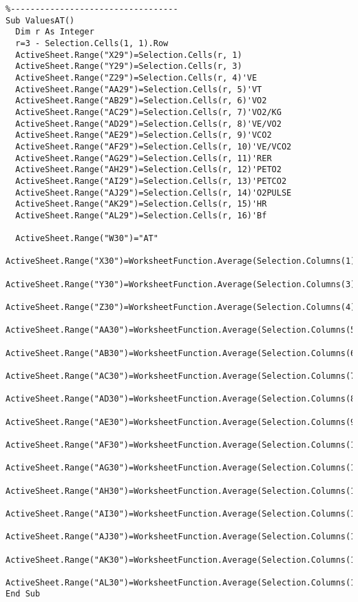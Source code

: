 \begin{lstlisting}
%----------------------------------
Sub ValuesAT()
  Dim r As Integer
  r=3 - Selection.Cells(1, 1).Row
  ActiveSheet.Range("X29")=Selection.Cells(r, 1)
  ActiveSheet.Range("Y29")=Selection.Cells(r, 3)
  ActiveSheet.Range("Z29")=Selection.Cells(r, 4)'VE
  ActiveSheet.Range("AA29")=Selection.Cells(r, 5)'VT
  ActiveSheet.Range("AB29")=Selection.Cells(r, 6)'VO2
  ActiveSheet.Range("AC29")=Selection.Cells(r, 7)'VO2/KG
  ActiveSheet.Range("AD29")=Selection.Cells(r, 8)'VE/VO2
  ActiveSheet.Range("AE29")=Selection.Cells(r, 9)'VCO2
  ActiveSheet.Range("AF29")=Selection.Cells(r, 10)'VE/VCO2
  ActiveSheet.Range("AG29")=Selection.Cells(r, 11)'RER
  ActiveSheet.Range("AH29")=Selection.Cells(r, 12)'PETO2
  ActiveSheet.Range("AI29")=Selection.Cells(r, 13)'PETCO2
  ActiveSheet.Range("AJ29")=Selection.Cells(r, 14)'O2PULSE
  ActiveSheet.Range("AK29")=Selection.Cells(r, 15)'HR
  ActiveSheet.Range("AL29")=Selection.Cells(r, 16)'Bf
  
  ActiveSheet.Range("W30")="AT"
  ActiveSheet.Range("X30")=WorksheetFunction.Average(Selection.Columns(1))'TIME
  ActiveSheet.Range("Y30")=WorksheetFunction.Average(Selection.Columns(3))'LOAD
  ActiveSheet.Range("Z30")=WorksheetFunction.Average(Selection.Columns(4))'VE
  ActiveSheet.Range("AA30")=WorksheetFunction.Average(Selection.Columns(5))'VT
  ActiveSheet.Range("AB30")=WorksheetFunction.Average(Selection.Columns(6))'VO2
  ActiveSheet.Range("AC30")=WorksheetFunction.Average(Selection.Columns(7))'VO2/KG
  ActiveSheet.Range("AD30")=WorksheetFunction.Average(Selection.Columns(8))'VE/VO2
  ActiveSheet.Range("AE30")=WorksheetFunction.Average(Selection.Columns(9))'VCO2
  ActiveSheet.Range("AF30")=WorksheetFunction.Average(Selection.Columns(10))'VE/VCO2
  ActiveSheet.Range("AG30")=WorksheetFunction.Average(Selection.Columns(11))'RER
  ActiveSheet.Range("AH30")=WorksheetFunction.Average(Selection.Columns(12))'PETO2
  ActiveSheet.Range("AI30")=WorksheetFunction.Average(Selection.Columns(13))'PETCO2
  ActiveSheet.Range("AJ30")=WorksheetFunction.Average(Selection.Columns(14))'O2PULSE
  ActiveSheet.Range("AK30")=WorksheetFunction.Average(Selection.Columns(15))'HR
  ActiveSheet.Range("AL30")=WorksheetFunction.Average(Selection.Columns(16))'Bf
End Sub


\end{lstlisting}
